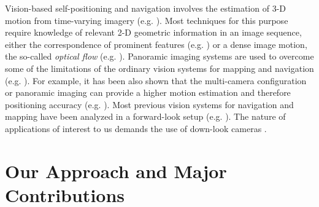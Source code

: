 Vision-based self-positioning and navigation involves the estimation of 3-D motion from
time-varying imagery (e.g. \cite{alo84,alo86,bru83,neg00p,ste96p,ste96}). Most techniques for this
purpose require knowledge of relevant 2-D geometric information in an image sequence, either the
correspondence of prominent features (e.g. \cite{blo88}) or a dense image motion, the so-called
\emph{optical flow} (e.g. \cite{bru83}). Panoramic imaging systems are used to overcome some of the
limitations of the ordinary vision systems for mapping and navigation (e.g.
\cite{arg01,cha00,neg01,nel87,win00,zhu00}). For example, it has been also shown that the
multi-camera configuration or panoramic imaging can provide a higher motion estimation and
therefore positioning accuracy (e.g. \cite{fir03-1,nel87,ped00}). Most previous vision systems for
navigation and mapping have been analyzed in a forward-look setup (e.g.
\cite{arg01,ben00,cha00,zhe92}). The nature of applications of interest to us demands the use of
down-look cameras \cite{fir03-1,neg01}.




\section{Our Approach and Major Contributions}

